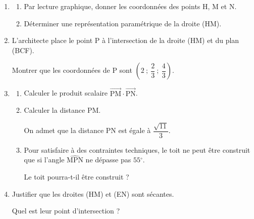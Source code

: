 \documentclass[10pt]{article}
\providecommand{\degres}{\ensuremath{^\circ}}
\providecommand{\vect}[1]{\overrightarrow{#1}}
\providecommand{\degres}{{^\circ}}
\begin{document}
\medskip

\begin{enumerate}
\item 
	\begin{enumerate}
		\item Par lecture graphique, donner les coordonnées des points H, M et N.
		\item Déterminer une représentation paramétrique de la droite (HM).
	\end{enumerate}
\item L'architecte place le point P à l'intersection de la droite (HM) et du plan (BCF).

Montrer que les coordonnées de P sont $\left(2~;~\dfrac23~;~\dfrac43\right)$.
\item
	\begin{enumerate}
		\item Calculer le produit scalaire $\vect{\text{PM}} \cdot \vect{\text{PN}}$.
		\item Calculer la distance PM.
		
On admet que la distance PN est égale à $\dfrac{\sqrt{11}}{3}$.
		\item Pour satisfaire à des contraintes techniques, le toit ne peut être construit que si l'angle $\widehat{\text{MPN}}$ ne dépasse pas $55\degres$.
		
Le toit pourra-t-il être construit ?
	\end{enumerate}
\item Justifier que les droites (HM) et (EN) sont sécantes.

Quel est leur point d'intersection ?
\end{enumerate}

\bigskip
\end{document}
